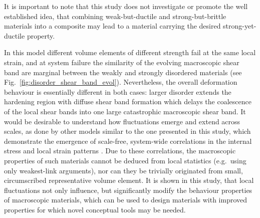 It is important to note that this study does not investigate or promote the well established idea, that combining weak-but-ductile and strong-but-brittle materials into a composite may lead to a material carrying the desired strong-yet-ductile property.

In this model different volume elements of different strength fail at the same local strain, and at system failure the similarity of the evolving macroscopic shear band are marginal between the weakly and strongly disordered materials (see Fig.~\ref{fig:disorder_shear_band_evol}). Nevertheless, the overall deformation behaviour is essentially different in both cases: larger disorder extends the hardening region with diffuse shear band formation which delays the coalescence of the local shear bands into one large catastrophic macroscopic shear band. It would be desirable to understand how fluctuations emerge and extend across scales, as done by other models similar to the one presented in this study, which demonstrate the emergence of scale-free, system-wide correlations in the internal stress and local strain patterns \cite{zaiser2006scale,1742-5468-2015-8-P08009}. Due to these correlations, the macroscopic properties of such materials cannot be deduced from local statistics (e.g.\ using only weakest-link arguments), nor can they be trivially originated from small, circumscribed representative volume element. It is shown in this study, that local fluctuations not only influence, but significantly modify the behaviour properties of macroscopic materials, which can be used to design materials with improved properties for which novel conceptual tools may be needed.

